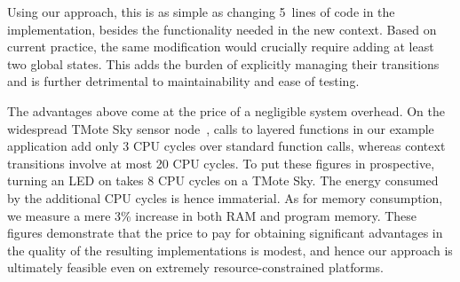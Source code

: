Using our approach, this is as simple as changing 5~lines of code in
the \conesc implementation, besides the functionality needed in the
new  context.  Based on current practice, the same
modification would crucially require adding at least two global
states.  This adds the burden of explicitly managing their
transitions and is further detrimental to maintainability and ease
of testing.

 The advantages above come at the price
of a negligible system overhead. On the widespread TMote Sky sensor
node~\cite{polastre05telos}, calls to layered functions in our example
application add only 3 CPU cycles over standard function calls,
whereas context transitions involve at most 20 CPU cycles. To put
these figures in prospective, turning an LED on takes 8 CPU cycles on
a TMote Sky. The energy consumed by the additional CPU cycles is
hence immaterial. As for memory consumption, we measure a mere 3\%
increase in both RAM and program memory. These figures demonstrate
that the price to pay for obtaining significant advantages in the
quality of the resulting implementations is modest, and hence our
approach is ultimately feasible even on extremely resource-constrained
platforms.





